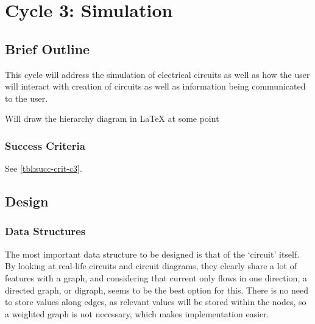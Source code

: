 \chapter{Cycle 3: Simulation}
\graphicspath{{figures}}



\section{Brief Outline}

    This cycle will address the simulation of electrical circuits as well as how the user will interact with creation of circuits as well as information being communicated to the user.
    
    Will draw the hierarchy diagram in LaTeX at some point






    \subsection{Success Criteria}
        See \autoref{tbl:succ-crit-c3}.

\section{Design}

    \subsection{Data Structures}
        The most important data structure to be designed is that of the `circuit' itself. 
        By looking at real-life circuits and circuit diagrams, they clearly share a lot of features with a graph, and considering that current only flows in one direction, a directed graph, or digraph, seems to be the best option for this. 
        There is no need to store values along edges, as relevant values will be stored within the nodes, so a weighted graph is not necessary, which makes implementation easier. 

